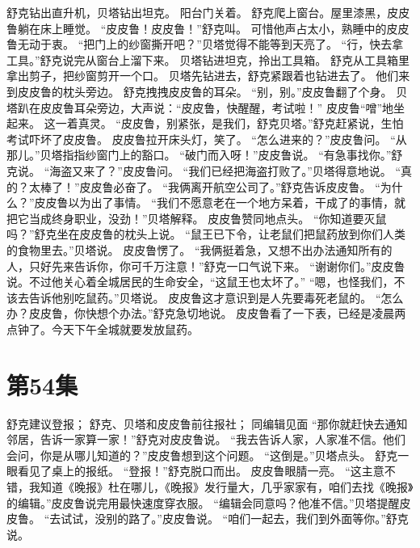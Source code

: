 \documentclass[a4paper,12pt,UTF8,twoside]{ctexbook}
\begin{document}
        舒克钻出直升机，贝塔钻出坦克。 
        阳台门关着。 
        舒克爬上窗台。屋里漆黑，皮皮鲁躺在床上睡觉。 
        “皮皮鲁！皮皮鲁！”舒克叫。 
        可惜他声占太小，熟睡中的皮皮鲁无动于衷。 
        “把门上的纱窗撕开吧？”贝塔觉得不能等到天亮了。 
        “行，快去拿工具。”舒克说完从窗台上溜下来。 
        贝塔钻进坦克，拎出工具箱。 
        舒克从工具箱里拿出剪子，把纱窗剪开一个口。 
        贝塔先钻进去，舒克紧跟着也钻进去了。 
        他们来到皮皮鲁的枕头旁边。 
        舒克拽拽皮皮鲁的耳朵。 
        “别，别。”皮皮鲁翻了个身。 
        贝塔趴在皮皮鲁耳朵旁边，大声说：“皮皮鲁，快醒醒，考试啦！” 
        皮皮鲁“噌”地坐起来。 
        这一着真灵。 
        “皮皮鲁，别紧张，是我们，舒克贝塔。”舒克赶紧说，生怕考试吓坏了皮皮鲁。 
        皮皮鲁拉开床头灯，笑了。 
        “怎么进来的？”皮皮鲁问。 
        “从那儿。”贝塔指指纱窗门上的豁口。 
        “破门而入呀！”皮皮鲁说。 
        “有急事找你。”舒克说。 
        “海盗又来了？”皮皮鲁问。 
        “我们已经把海盗打败了。”贝塔得意地说。 
        “真的？太棒了！”皮皮鲁必奋了。 
        “我俩离开航空公司了。”舒克告诉皮皮鲁。 
        “为什么？”皮皮鲁以为出了事情。 
        “我们不愿意老在一个地方呆着，干成了的事情，就把它当成终身职业，没劲！”贝塔解释。 
        皮皮鲁赞同地点头。 
        “你知道要灭鼠吗？”舒克坐在皮皮鲁的枕头上说。 
        “鼠王已下令，让老鼠们把鼠药放到你们人类的食物里去。”贝塔说。 
        皮皮鲁愣了。 
        “我俩挺着急，又想不出办法通知所有的人，只好先来告诉你，你可千万注意！”舒克一口气说下来。 
        “谢谢你们。”皮皮鲁说。不过他关心着全城居民的生命安全，“这鼠王也太坏了。” 
        “嗯，也怪我们，不该去告诉他别吃鼠药。”贝塔说。 
        皮皮鲁这才意识到是人先要毒死老鼠的。 
        “怎么办？皮皮鲁，你快想个办法。”舒克急切地说。 
        皮皮鲁看了一下表，已经是凌晨两点钟了。今天下午全城就要发放鼠药。   \chapter{第54集} 
        舒克建议登报； 
        舒克、贝塔和皮皮鲁前往报社； 
        同编辑见面   
        “那你就赶快去通知邻居，告诉一家算一家！”舒克对皮皮鲁说。 
        “我去告诉人家，人家准不信。他们会问，你是从哪儿知道的？”皮皮鲁想到这个问题。 
        “这倒是。”贝塔点头。 
        舒克一眼看见了桌上的报纸。 
        “登报！”舒克脱口而出。 
        皮皮鲁眼腈一亮。 
        “这主意不错，我知道《晚报》杜在哪儿，《晚报》发行量大，几乎家家有，咱们去找《晚报》的编辑。”皮皮鲁说完用最快速度穿衣服。 
        “编辑会同意吗？他准不信。”贝塔提醒皮皮鲁。 
        “去试试，没别的路了。”皮皮鲁说。 
        “咱们一起去，我们到外面等你。”舒克说。 
\end{document}
